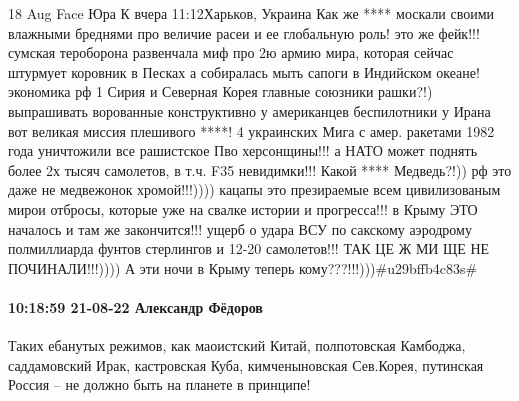 18 Aug
Face
Юра К
вчера 11:12Харьков, Украина
Как же **** москали своими влажными бреднями про величие расеи и ее глобальную роль! это же фейк!!!
сумская тероборона развенчала миф про 2ю армию мира, которая сейчас штурмует коровник в Песках а собиралась мыть сапоги в Индийском океане! экономика рф 1%
Сирия и Северная Корея главные союзники рашки?!) выпрашивать ворованные конструктивно у американцев беспилотники у Ирана вот великая миссия плешивого ****!
4 украинских Мига с амер. ракетами 1982 года уничтожили все рашистское Пво херсонщины!!! а НАТО может поднять более 2х тысяч самолетов, в т.ч. F35 невидимки!!! Какой **** Медведь?!)) рф это даже не медвежонок хромой!!!)))) кацапы это презираемые всем цивилизованым мирои отбросы, которые уже на свалке истории и прогресса!!!
в Крыму ЭТО началось и там же закончится!!! ущерб о удара ВСУ по сакскому аэродрому полмиллиарда фунтов стерлингов и 12-20 самолетов!!! ТАК ЦЕ Ж МИ ЩЕ НЕ ПОЧИНАЛИ!!!))))
А эти ночи в Крыму теперь кому???!!!)))#u29bffb4c83s#

\paragraph{10:18:59 21-08-22 Александр Фёдоров}

Таких ебанутых режимов, как маоистский Китай, полпотовская Камбоджа,
саддамовский Ирак, кастровская Куба, кимченыновская Сев.Корея, путинская Россия
-- не должно быть на планете в принципе!
